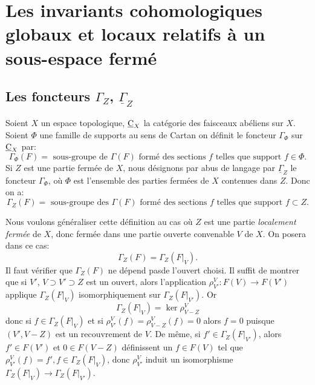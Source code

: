 \chapter[Les invariants cohomologiques globaux et locaux]
{Les invariants cohomologiques globaux et locaux relatifs \`a un sous-espace ferm\'e} \label{I}

\section{Les foncteurs $\Gamma_Z$, $\underline{\Gamma}_Z$} \label{I.1}
Soient $X$ un espace topologique, $\underline{\mathrm{C}}_X$ la cat\'egorie des faisceaux ab\'eliens sur $X$. Soient $\Phi$ une famille de supports au sens de Cartan on d\'efinit le foncteur $\Gamma_\Phi$ sur $\underline{\mathrm{C}}_X$ par:
\begin{equation} \label{eq:I.1} { \Gamma_\Phi(F) = \text{ sous-groupe de } \Gamma(F) \text{ formé des sections } f \text{ telles que support } f \in \Phi}.
\end{equation}
Si $Z$ est une partie ferm\'ee de $X$, nous d\'esignons par abus de langage par $\underline{\Gamma}_Z$ le foncteur $\Gamma_\Phi$, o\`u $\Phi$ est l'ensemble des parties ferm\'ees de $X$ contenues dans $Z$. Donc on a:
\begin{equation} \label{eq:I.2}
{\Gamma_Z(F) = \text{ sous-groupe des } \Gamma(F) \text{ formé des sections } f \text{ telles que support } f \subset Z}.
\end{equation}

Nous voulons g\'en\'eraliser cette d\'efinition au cas o\`u $Z$ est une partie \textit{localement fermée} de $X$, donc ferm\'ee dans une partie ouverte convenable $V$ de $X$. On posera dans ce cas:
\begin{equation} \label{eq:I.3} {\Gamma_Z(F)=\Gamma_Z(F|_{V})}.
\end{equation}
Il faut v\'erifier que $\Gamma_Z(F)$ \og ne d\'epend pas\fg de l'ouvert choisi. Il suffit de montrer que si $V'$, $V\supset V' \supset Z$ est un ouvert, alors l'application $\rho_{V'}^V: F(V) \to F(V')$ applique $\Gamma_Z(F|_{V})$ isomorphiquement sur $\Gamma_Z(F|_{V'})$. Or
\begin{equation} \label{eq:I.4} { \Gamma_Z(F|_{V}) = \ker \rho_{V-Z}^V}
\end{equation}
donc si $f\in \Gamma_Z(F|_{V})$ et si $\rho_{V'}^V(f)=\rho_{V-Z}^V(f)=0$ alors $f=0$ puisque $(V', V-Z)$ est un recouvrement de $V$. De m\^eme, si $f'\in \Gamma_Z(F|_{V'})$, alors $f'\in F(V')$ et $0\in F(V-Z)$ d\'efinissent un $f\in F(V)$ tel que $\rho_{V'}^V(f)=f', f\in \Gamma_Z(F|_{V})$, donc $\rho_{V'}^V$ induit un isomorphisme $\Gamma_Z(F|_{V}) \to \Gamma_Z(F|_{V'})$.

